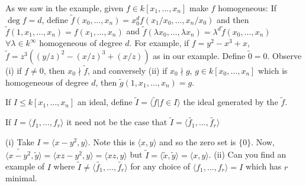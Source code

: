 \documentclass{article}
\begin{document}
As we saw in the example, given $f \in k[x_1, \dotsc, x_n]$ make $f$ homogeneous:
If $\deg f = d$, define $\tilde{f}(x_0, \dotsc, x_n) = x_0^d f(x_1/x_0, \dotsc, x_n/x_0)$ and then $\tilde{f}(1, x_1, \dotsc, x_n) = f(x_1, \dotsc, x_n)$ and $\tilde{f}(\lambda x_0, \dotsc, \lambda x_n) = \lambda^d \tilde{f}(x_0, \dotsc, x_n)$ $\forall \lambda \in k^\infty$ homogeneous of degree $d$.
For example, if $f = y^2 - x^3 + x$, $\tilde{f} = z^3 ((y/z)^2 - (x/z)^3 + (x/z))$ as in our example.
Define $\tilde{0} = 0$.
Observe
(i) if $f \neq 0$, then $x_0 \nmid \tilde{f}$, and conversely
(ii) if $x_0 \nmid g$, $g \in k[x_0, \dotsc, x_n]$ which is homogeneous of degree $d$, then $\tilde{g}(1, x_1, \dotsc, x_n) = g$.
\begin{defi}
    If $I \leq k[x_1, \dotsc, x_n]$ an ideal, define $\tilde{I} = \langle \tilde{f} | f \in I \rangle$ the ideal generated by the $\tilde{f}$.
\end{defi}
\begin{warning}
    If $I = \langle f_1, \dotsc, f_r \rangle$ it need not be the case that $\tilde{I} = \langle \tilde{f_1}, \dotsc, \tilde{f_r}\rangle$
\end{warning}
\begin{eg}
    (i) Take $I = \langle x - y^2, y \rangle$. Note this is $\langle x, y \rangle$ and so the zero set is $\{0\}$. Now, $\langle \widetilde{x - y^2}, \tilde{y} \rangle = \langle xz - y^2, y \rangle = \langle xz, y\rangle$ but $\tilde{I} = \langle \tilde{x}, \tilde{y} \rangle = \langle x, y \rangle$.
    (ii)  Can you find an example of $I$ where $\tilde{I} \neq \langle \tilde{f_1}, \dotsc, \tilde{f_r} \rangle$ for any choice of $\langle f_1, \dotsc, f_r \rangle = I$ which has $r$ minimal.
\end{eg}
\end{document}
